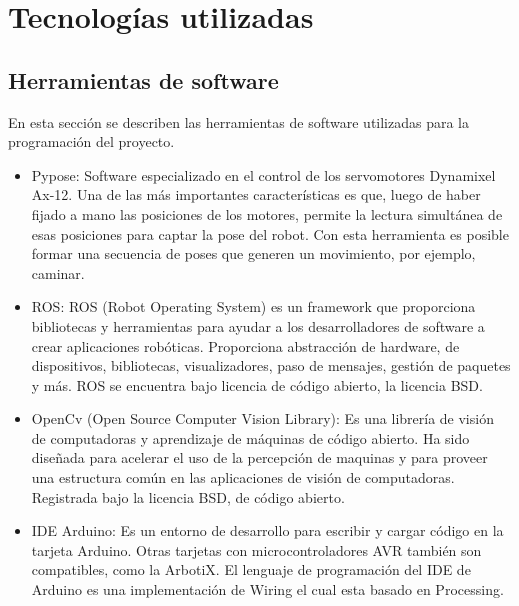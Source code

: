 \chapter{Tecnologías utilizadas}\label{chapter:Tecnologias_utilizadas}

\section{ Herramientas de software}
En esta sección se describen las herramientas de software utilizadas para la programación del proyecto.
\begin{itemize}
\item Pypose: Software especializado en el control de los servomotores Dynamixel Ax-12. Una de las más importantes
características es que, luego de haber fijado a mano las posiciones de los motores, permite la lectura simultánea de esas
posiciones para captar la pose del robot. Con esta herramienta es posible formar una secuencia de poses que generen un
movimiento, por ejemplo, caminar. \cite{pypose}

\item ROS: ROS (Robot Operating System) es un framework que proporciona bibliotecas y herramientas para ayudar a los desarrolladores de software a crear aplicaciones robóticas. Proporciona abstracción de hardware,  de dispositivos, bibliotecas, visualizadores, paso de mensajes, gestión de paquetes y más. ROS se encuentra bajo licencia de código abierto, la licencia BSD.

\item OpenCv (Open Source Computer Vision Library): Es una librería de visión de computadoras y aprendizaje de máquinas de código abierto. Ha sido diseñada para acelerar el uso de la percepción de maquinas y para proveer una estructura común en las aplicaciones de visión de computadoras. Registrada bajo la licencia BSD, de código abierto. \cite{opencv}

\item IDE Arduino: Es un entorno de desarrollo para escribir y cargar código en la tarjeta Arduino. Otras tarjetas
con microcontroladores AVR también son compatibles, como la ArbotiX. El lenguaje de programación del IDE de Arduino es una
implementación de Wiring el cual esta basado en Processing.  \cite{arduino}

\end{itemize}

